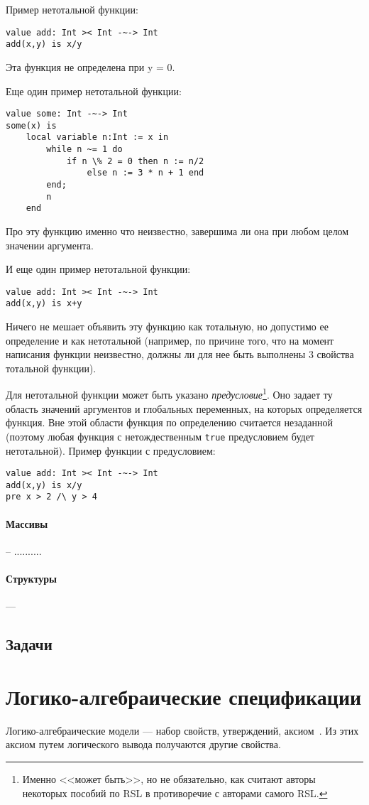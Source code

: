 \documentclass[14pt, twoside]{extreport}
\newcommand{\head}[1]{\vspace{1cm}\subsubsection*{#1}}
\begin{document}
Пример нетотальной функции:
\begin{lstlisting}
value add: Int >< Int -~-> Int
add(x,y) is x/y
\end{lstlisting}
Эта функция не определена при y = 0.

Еще один пример нетотальной функции:
\begin{lstlisting}
value some: Int -~-> Int
some(x) is
    local variable n:Int := x in
        while n ~= 1 do
            if n \% 2 = 0 then n := n/2
                else n := 3 * n + 1 end
        end;
        n
    end
\end{lstlisting}
Про эту функцию именно что неизвестно, завершима ли она при любом целом значении аргумента.

И еще один пример нетотальной функции:
\begin{lstlisting}
value add: Int >< Int -~-> Int
add(x,y) is x+y
\end{lstlisting}
Ничего не мешает объявить эту функцию как тотальную, но допустимо ее определение и как нетотальной (например, по причине того, что на момент написания функции неизвестно, должны ли для нее быть выполнены 3 свойства тотальной функции).

Для нетотальной функции может быть указано \emph{предусловие}\footnote{Именно <<может быть>>, но не обязательно, как считают авторы некоторых пособий по RSL в противоречие с авторами самого RSL.}. Оно задает ту область значений аргументов и глобальных переменных, на которых определяется функция. Вне этой области функция по определению считается незаданной (поэтому любая функция с нетождественным \texttt{true} предусловием будет нетотальной). Пример функции с предусловием:
\begin{lstlisting}
value add: Int >< Int -~-> Int
add(x,y) is x/y
pre x > 2 /\ y > 4
\end{lstlisting}


\head{Массивы} -- ..........

\head{Структуры} ---

\section*{Задачи}



\chapter{Логико-алгебраические спецификации}

Логико-алгебраические модели --- набор свойств, утверждений, аксиом~\cite{kuliamin}. Из этих аксиом путем логического вывода получаются другие свойства.
\end{document}
